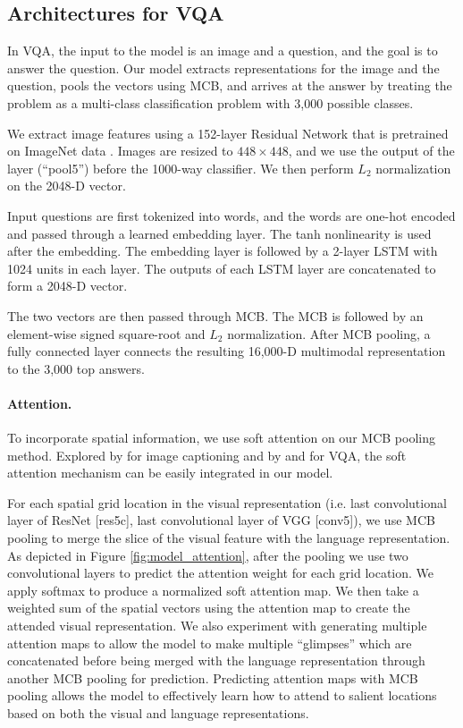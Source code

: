 \documentclass[11pt,letterpaper]{article}
\newcommand{\myparagraph}[1]{\paragraph{#1}}
\begin{document}
\subsection{Architectures for VQA}
\label{sec:architecture:vqa}

In VQA, the input to the model is an image and a question, and the goal is to answer the question. Our model extracts representations for the image and the question, pools the vectors using MCB, and arrives at the answer by treating the problem as a multi-class classification problem with 3,000 possible classes.

We extract image features using a 152-layer Residual Network \cite{he2015deep} that is pretrained on ImageNet data \cite{deng09imagenet}. Images are resized to $ 448 \times 448 $, and we use the output of the layer (``pool5'') before the 1000-way classifier. We then perform $L_2$ normalization on the 2048-D vector.




Input questions are first tokenized into words, and the words are one-hot encoded and passed through a learned embedding layer. The tanh nonlinearity is used after the embedding. The embedding layer is followed by a 2-layer LSTM with 1024 units in each layer. The outputs of each LSTM layer are concatenated to form a 2048-D vector.

The two vectors are then passed through MCB. The MCB is followed by an element-wise signed square-root and $L_2$ normalization. After MCB pooling, a fully connected layer connects the resulting 16,000-D multimodal representation to the 3,000 top answers.

\myparagraph{Attention.}
\label{sec:architecture:att}
To incorporate spatial information, we use soft attention on our MCB pooling method.  Explored by \cite{xu15icml} for image captioning and by \cite{xu2015ask} and \cite{yang2015stacked} for VQA, the soft attention mechanism can be easily integrated in our model.

For each spatial grid location in the visual representation (i.e. last convolutional layer of ResNet [res5c], last convolutional layer of VGG [conv5]), we use MCB pooling to merge the slice of the visual feature with the language representation. As depicted in Figure \ref{fig:model_attention}, after the pooling we use two convolutional layers to predict the attention weight for each grid location. We apply softmax to produce a normalized soft attention map.
We then take a weighted sum of the spatial vectors using the attention map to create the attended  visual representation. We also experiment with generating multiple attention maps to allow the model to make multiple ``glimpses'' which are concatenated before being merged with the language representation through another MCB pooling for prediction. Predicting attention maps with MCB pooling allows the model to effectively learn how to attend to salient locations based on both the visual and language representations. 
\end{document}
